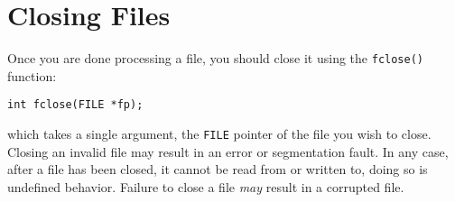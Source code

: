 \section{Closing Files}

Once you are done processing a file, you should close it
using the \texttt{fclose()} function:

\texttt{int fclose(FILE *fp);}

which takes a single argument, the \texttt{FILE}
pointer of the file you wish to close.  Closing an invalid
file may result in an error or segmentation fault.  In any
case, after a file has been closed, it cannot be read from
or written to, doing so is undefined
behavior. Failure to close a file \emph{may} result in a 
corrupted file. 






